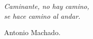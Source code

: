 \setlength{\leftmargin}{0.5\textwidth}
\setlength{\parsep}{0cm}
\addtolength{\topsep}{0.5cm}

\begin{flushright}
\small\em{
Caminante, no hay camino,\\
se hace camino al andar.\\
}
\end{flushright}

\begin{flushright}
\small{Antonio Machado.}
\end{flushright}

\cleardoublepage %